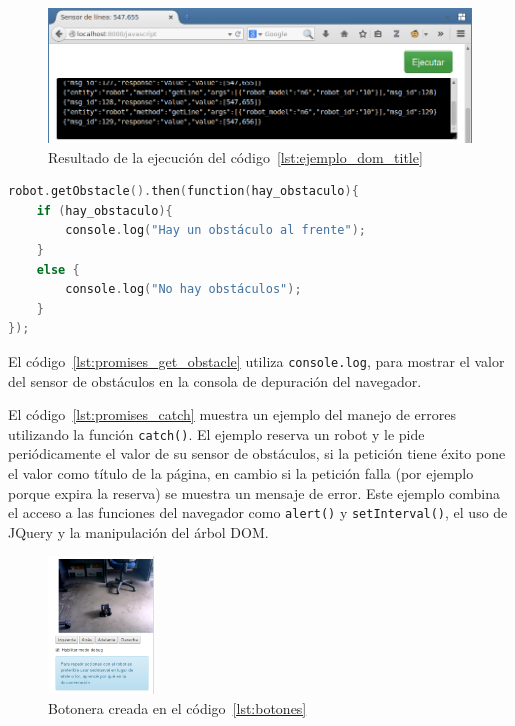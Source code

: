 \begin{figure}
    \centering
    \includegraphics[width=1\textwidth]{figures/ejemplo_web_sensor}
    \caption{Resultado de la ejecución del código~\ref{lst:ejemplo_dom_title}}
    \label{fig:ejemplo_web_sensor}
\end{figure}
\newpage %
\begin{lstlisting}[language=C,
caption={Implementación de \texttt{getObstacle()} con ``promesas''},
label=lst:promises_get_obstacle]
robot.getObstacle().then(function(hay_obstaculo){
    if (hay_obstaculo){
        console.log("Hay un obstáculo al frente");
    }
    else {
        console.log("No hay obstáculos");
    }
});
\end{lstlisting}

El código~\ref{lst:promises_get_obstacle} utiliza \texttt{console.log},
para mostrar el valor del sensor de obstáculos en la consola de depuración
del navegador.






El código~\ref{lst:promises_catch} muestra un ejemplo del manejo de errores
utilizando la función \texttt{catch()}. El ejemplo reserva un robot y
le pide periódicamente el valor de su sensor de obstáculos, si la petición tiene
éxito pone el valor como título de la página, en cambio si la petición falla
(por ejemplo porque expira la reserva) se muestra un mensaje de error.
Este ejemplo combina el acceso
a las funciones del navegador como \texttt{alert()} y \texttt{setInterval()},
el uso de JQuery y la manipulación del árbol DOM.

\begin{figure}
        \centering
        \includegraphics[width=0.25\textwidth]{figures/botones}
        \caption{Botonera creada en el código~\ref{lst:botones}}
        \label{fig:botones}
\end{figure}

